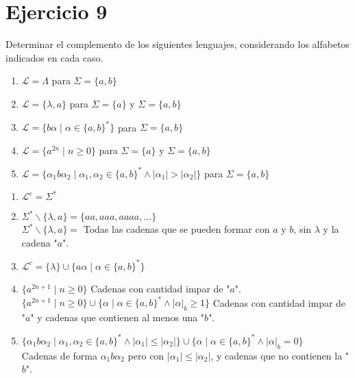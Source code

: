 \documentclass[12pt]{article}
\begin{document}
\section*{Ejercicio 9}
Determinar el complemento de los siguientes lenguajes, considerando los alfabetos indicados en cada caso.
\begin{enumerate}[label=\Roman*.]
    \item $\mathcal{L} = \Lambda$ para $\Sigma = \{a, b\}$
    \item $\mathcal{L} = \{\lambda, a\}$ para $\Sigma = \{a\}$ y $\Sigma = \{a, b\}$
    \item $\mathcal{L} = \{b\alpha \mid \alpha \in \{a, b\}^*\}$ para $\Sigma = \{a, b\}$
    \item $\mathcal{L} = \{a^{2n} \mid n \geq 0\}$ para $\Sigma = \{a\}$ y $\Sigma = \{a, b\}$
    \item $\mathcal{L} = \{\alpha_1 b \alpha_2 \mid \alpha_1, \alpha_2 \in \{a, b\}^* \land |\alpha_1| > |\alpha_2|\}$ para $\Sigma = \{a, b\}$
\end{enumerate}
\begin{enumerate}[label=\roman*.,font=\itshape]
    \item $\mathcal{L}^c = \Sigma^*$
    \item $\Sigma^* \backslash \{\lambda,a\} = \{aa,aaa,aaaa,...\}$ \\
          $\Sigma^* \backslash \{\lambda, a\} =$ Todas las cadenas que se pueden formar con $a$ y $b$, sin $\lambda$ y la cadena "$a$".
    \item $\mathcal{L}^c= \{\lambda\} \cup \{a\alpha \mid \alpha \in \{a,b\}^*\}$
    \item $\{a^{2n +1} \mid n \geq 0\}$ Cadenas con cantidad impar de "$a$".\\
          $\{a^{2n +1} \mid n \geq 0 \} \cup \{\alpha \mid \alpha \in \{a,b\}^* \land |\alpha|_b \geq 1\}$ Cadenas con cantidad impar de "$a$" y cadenas que contienen al menos una "$b$".
    \item $\{\alpha_1b\alpha_2 \mid \alpha_1, \alpha_2 \in \{a, b\}^* \land |\alpha_1| \leq |\alpha_2|\} \cup \{\alpha \mid \alpha \in \{a,b\}^* \land |\alpha|_b = 0\}$ \\
    Cadenas de forma $\alpha_1b\alpha_2$ pero con $|\alpha_1| \leq |\alpha_2|$, y cadenas que no contienen la "$b$".
\end{enumerate}
\end{document}
